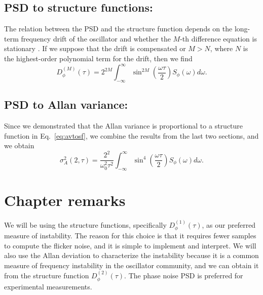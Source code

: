 \subsection{PSD to structure functions:}
%
The relation between the PSD and the structure function depends on the long-term frequency drift of the oscillator and whether the $M$-th difference equation is stationary \cite{Lindsey1976}. If we suppose that the drift is compensated or $M > N$, where $N$ is the highest-order polynomial term for the drift, then we find
%
\begin{equation}
	D_\phi^{(M)}(\tau) = 2^{2M}\int_{-\infty}^{\infty} \sin^{2M}\left( \frac{\omega\tau}{2}\right) S_\phi(\omega) d\omega.
\end{equation}

\subsection{PSD to Allan variance:}
%
Since we demonstrated that the Allan variance is proportional to a structure function in Eq.~\ref{eq:avtosf}, we combine the results from the last two sections, and we obtain
%
\begin{equation}
\sigma_A^2(2,\tau) = \frac{2^2}{\omega_0^2\tau^2} \int_{-\infty}^{\infty} \sin^4\left( \frac{\omega\tau}{2} \right) S_\phi(\omega) d\omega.
\end{equation}

\section{Chapter remarks} \label{sec:2conc}
%
We will be using the structure functions, specifically $D^{(1)}_\phi(\tau)$, as our preferred measure of instability. The reason for this choice is that it requires fewer samples to compute the flicker noise, and it is simple to implement and interpret. We will also use the Allan deviation to characterize the instability because it is a common measure of frequency instability in the oscillator community, and we can obtain it from the structure function $D_\phi^{(2)}(\tau)$. The phase noise PSD is preferred for experimental measurements.

